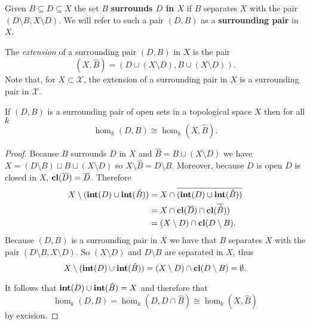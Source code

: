 \begin{definition}[Surrounding]
  Given $B\subseteq D\subseteq X$ the set $B$ \textbf{surrounds $D$ in $X$} if $B$ separates $X$ with the pair $(D\setminus B, X\setminus D)$.
  We will refer to such a pair $(D, B)$ as a \textbf{surrounding pair} in $X$.
\end{definition}

\begin{definition}[Excension]
  The \emph{extension} of a surrounding pair $(D, B)$ in $X$ is the pair
  \[ (X, \hat{B}) = (D\cup (X\setminus D), B\cup (X\setminus D)).\]
  Note that, for $X\subset\mathcal{X}$, the extension of a surrounding pair in $X$ is a surrounding pair in $\mathcal{X}$.
\end{definition}

\begin{lemma}\label{lem:extension_iso}
  If $(D, B)$ is a surrounding pair of open sets in a topological space $X$ then for all $k$
  \[ \hom_k(D, B)\cong \hom_k(X, \hat{B}).\]
\end{lemma}
\begin{proof}
  Because $B$ surrounds $D$ in $X$ and $\hat{B} = B\sqcup (X\setminus D)$ we have $X = (D\setminus B)\sqcup B\sqcup (X\setminus D)$ so $X\setminus \hat{B} = D\setminus B$.
  Moreover, because $D$ is open $\overline{D}$ is closed in $X$, $\mathbf{cl}(\overline{D}) = \overline{D}$.
  Therefore
  \begin{align*}
    X\setminus (\mathbf{int}(D)\cup\mathbf{int}(\hat{B})) &= X\cap \overline{(\mathbf{int}(D)\cup\mathbf{int}(\hat{B}))}\\
      &= X\cap \mathbf{cl}(\overline{D})\cap\mathbf{cl}(\overline{\hat{B}})) \\
      &= (X\setminus D)\cap \mathbf{cl}(D\setminus B).
  \end{align*}
  Because $(D, B)$ is a surrounding pair in $X$ we have that $B$ separates $X$ with the pair $(D\setminus B, X\setminus D)$.
  So $(X\setminus D)$ and $D\setminus B$ are separated in $X$, thus
  \[ X\setminus (\mathbf{int}(D)\cup\mathbf{int}(\hat{B})) = (X\setminus D)\cap \mathbf{cl}(D\setminus B) =\emptyset.\]

  It follows that $\mathbf{int}(D)\cup\mathbf{int}(\hat{B}) = X$ and therefore that
  \[ \hom_k(D, B) = \hom_k(D, D\cap \hat{B}) \cong \hom_k(X, \hat{B})\]
  by excision.
\end{proof}

